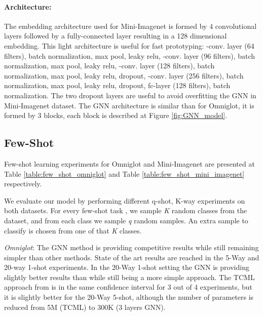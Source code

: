 \documentclass{article} \usepackage{iclr2018_conference,times}
\begin{document}
\paragraph{Architecture:}
\label{architecture_mini_imagenet}
The embedding architecture used for Mini-Imagenet is formed by 4 convolutional layers followed by a fully-connected layer resulting in a 128 dimensional embedding. This light architecture is useful for fast prototyping: 
-conv. layer (64 filters), batch normalization, max pool, leaky relu,
-conv. layer (96 filters), batch normalization, max pool, leaky relu,
-conv. layer (128 filters), batch normalization, max pool, leaky relu, dropout, 
-conv. layer (256 filters), batch normalization, max pool, leaky relu, dropout,
 fc-layer (128 filters), batch normalization. 
\newline
The two dropout layers are useful to avoid overfitting the GNN in Mini-Imagenet dataset.
The GNN architecture is similar than for Omniglot, it is formed by 3 blocks, each block is described at Figure \ref{fig:GNN_model}.

\subsection{Few-Shot}
Few-shot learning experiments for Omniglot and Mini-Imagenet are presented at Table \ref{table:few_shot_omniglot} and Table \ref{table:few_shot_mini_imagenet} respectively. 

We evaluate our model by performing different q-shot, K-way experiments on both datasets. For every few-shot task , we sample \textit{K} random classes from the dataset, and from each class we sample \textit{q} random samples. An extra sample to classify is chosen from one of that \textit{K} classes.



\textit{Omniglot}: The GNN method is providing competitive results while still remaining simpler than other methods. State of the art results are reached in the 5-Way and 20-way 1-shot experiments. In the 20-Way 1-shot setting the GNN is providing slightly better results than \cite{munkhdalai2017meta} while still being a more simple approach. The TCML approach from \cite{mishra2017meta} is in the same confidence interval for 3 out of 4 experiments, but it is slightly better for the 20-Way 5-shot, although the number of parameters is reduced from 5M (TCML) to 300K (3 layers GNN).
\end{document}
